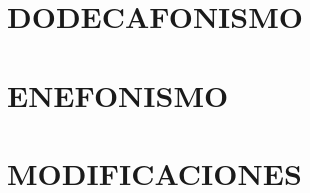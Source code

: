 \documentclass[twoside]{book}
\begin{document}
	
    
    
	
	\pagestyle{fancy}
	
	\addtocounter{chapter}{-1}%
	
    \part{DODECAFONISMO}
    
	
    
	\part{ENEFONISMO}%
    
    
    \part{MODIFICACIONES}
	
	
    
    
    
	\cleardoublepage
    
	

	\cleardoublepage
    
\end{document}
